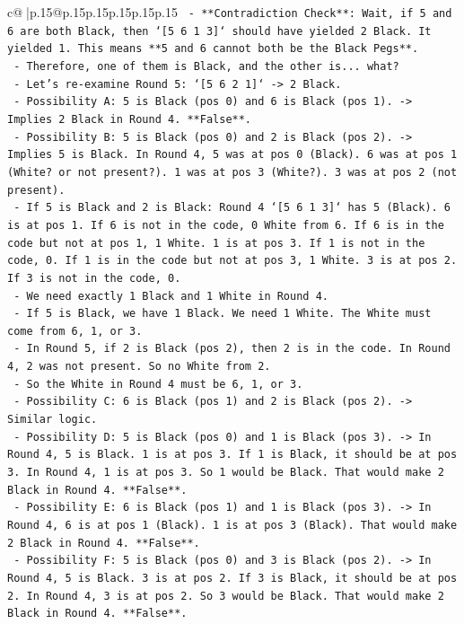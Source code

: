 \documentclass{article}
\begin{document}
{\begin{supertabular}{c@{$\;$}|p{.15\linewidth}@{}p{.15\linewidth}p{.15\linewidth}p{.15\linewidth}p{.15\linewidth}p{.15\linewidth}}
{{{\texttt{    {-} **Contradiction Check**: Wait, if 5 and 6 are both Black, then `{[}5 6 1 3{]}` should have yielded 2 Black. It yielded 1. This means **5 and 6 cannot both be the Black Pegs**.} \\
\texttt{    {-} Therefore, one of them is Black, and the other is... what?} \\
\texttt{    {-} Let's re{-}examine Round 5: `{[}5 6 2 1{]}` {-}> 2 Black.} \\
\texttt{        {-} Possibility A: 5 is Black (pos 0) and 6 is Black (pos 1). {-}> Implies 2 Black in Round 4. **False**.} \\
\texttt{        {-} Possibility B: 5 is Black (pos 0) and 2 is Black (pos 2). {-}> Implies 5 is Black. In Round 4, 5 was at pos 0 (Black). 6 was at pos 1 (White? or not present?). 1 was at pos 3 (White?). 3 was at pos 2 (not present).} \\
\texttt{            {-} If 5 is Black and 2 is Black: Round 4 `{[}5 6 1 3{]}` has 5 (Black). 6 is at pos 1. If 6 is not in the code, 0 White from 6. If 6 is in the code but not at pos 1, 1 White. 1 is at pos 3. If 1 is not in the code, 0. If 1 is in the code but not at pos 3, 1 White. 3 is at pos 2. If 3 is not in the code, 0.} \\
\texttt{            {-} We need exactly 1 Black and 1 White in Round 4.} \\
\texttt{            {-} If 5 is Black, we have 1 Black. We need 1 White. The White must come from 6, 1, or 3.} \\
\texttt{            {-} In Round 5, if 2 is Black (pos 2), then 2 is in the code. In Round 4, 2 was not present. So no White from 2.} \\
\texttt{            {-} So the White in Round 4 must be 6, 1, or 3.} \\
\texttt{        {-} Possibility C: 6 is Black (pos 1) and 2 is Black (pos 2). {-}> Similar logic.} \\
\texttt{        {-} Possibility D: 5 is Black (pos 0) and 1 is Black (pos 3). {-}> In Round 4, 5 is Black. 1 is at pos 3. If 1 is Black, it should be at pos 3. In Round 4, 1 is at pos 3. So 1 would be Black. That would make 2 Black in Round 4. **False**.} \\
\texttt{        {-} Possibility E: 6 is Black (pos 1) and 1 is Black (pos 3). {-}> In Round 4, 6 is at pos 1 (Black). 1 is at pos 3 (Black). That would make 2 Black in Round 4. **False**.} \\
\texttt{        {-} Possibility F: 5 is Black (pos 0) and 3 is Black (pos 2). {-}> In Round 4, 5 is Black. 3 is at pos 2. If 3 is Black, it should be at pos 2. In Round 4, 3 is at pos 2. So 3 would be Black. That would make 2 Black in Round 4. **False**.} \\
}}}
\end{supertabular}}
\end{document}
